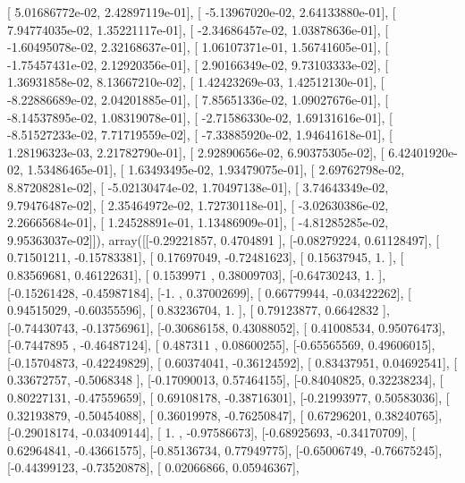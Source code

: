 \documentclass{article}
\begin{document}
       [  5.01686772e-02,   2.42897119e-01],
       [ -5.13967020e-02,   2.64133880e-01],
       [  7.94774035e-02,   1.35221117e-01],
       [ -2.34686457e-02,   1.03878636e-01],
       [ -1.60495078e-02,   2.32168637e-01],
       [  1.06107371e-01,   1.56741605e-01],
       [ -1.75457431e-02,   2.12920356e-01],
       [  2.90166349e-02,   9.73103333e-02],
       [  1.36931858e-02,   8.13667210e-02],
       [  1.42423269e-03,   1.42512130e-01],
       [ -8.22886689e-02,   2.04201885e-01],
       [  7.85651336e-02,   1.09027676e-01],
       [ -8.14537895e-02,   1.08319078e-01],
       [ -2.71586330e-02,   1.69131616e-01],
       [ -8.51527233e-02,   7.71719559e-02],
       [ -7.33885920e-02,   1.94641618e-01],
       [  1.28196323e-03,   2.21782790e-01],
       [  2.92890656e-02,   6.90375305e-02],
       [  6.42401920e-02,   1.53486465e-01],
       [  1.63493495e-02,   1.93479075e-01],
       [  2.69762798e-02,   8.87208281e-02],
       [ -5.02130474e-02,   1.70497138e-01],
       [  3.74643349e-02,   9.79476487e-02],
       [  2.35464972e-02,   1.72730118e-01],
       [ -3.02630386e-02,   2.26665684e-01],
       [  1.24528891e-01,   1.13486909e-01],
       [ -4.81285285e-02,   9.95363037e-02]]), array([[-0.29221857,  0.4704891 ],
       [-0.08279224,  0.61128497],
       [ 0.71501211, -0.15783381],
       [ 0.17697049, -0.72481623],
       [ 0.15637945,  1.        ],
       [ 0.83569681,  0.46122631],
       [ 0.1539971 ,  0.38009703],
       [-0.64730243,  1.        ],
       [-0.15261428, -0.45987184],
       [-1.        ,  0.37002699],
       [ 0.66779944, -0.03422262],
       [ 0.94515029, -0.60355596],
       [ 0.83236704,  1.        ],
       [ 0.79123877,  0.6642832 ],
       [-0.74430743, -0.13756961],
       [-0.30686158,  0.43088052],
       [ 0.41008534,  0.95076473],
       [-0.7447895 , -0.46487124],
       [ 0.487311  ,  0.08600255],
       [-0.65565569,  0.49606015],
       [-0.15704873, -0.42249829],
       [ 0.60374041, -0.36124592],
       [ 0.83437951,  0.04692541],
       [ 0.33672757, -0.5068348 ],
       [-0.17090013,  0.57464155],
       [-0.84040825,  0.32238234],
       [ 0.80227131, -0.47559659],
       [ 0.69108178, -0.38716301],
       [-0.21993977,  0.50583036],
       [ 0.32193879, -0.50454088],
       [ 0.36019978, -0.76250847],
       [ 0.67296201,  0.38240765],
       [-0.29018174, -0.03409144],
       [ 1.        , -0.97586673],
       [-0.68925693, -0.34170709],
       [ 0.62964841, -0.43661575],
       [-0.85136734,  0.77949775],
       [-0.65006749, -0.76675245],
       [-0.44399123, -0.73520878],
       [ 0.02066866,  0.05946367],
\end{document}

